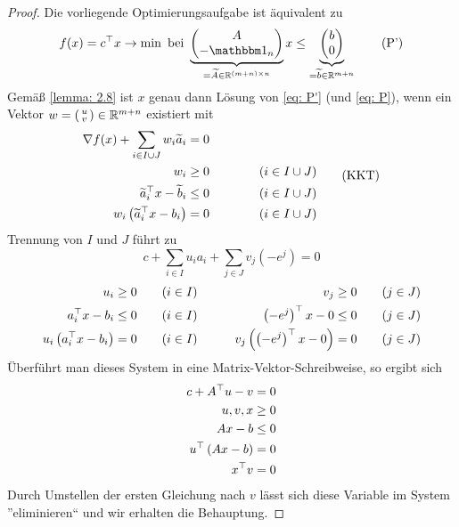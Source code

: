 \begin{proof}
	Die vorliegende Optimierungsaufgabe ist äquivalent zu
	\begin{equation*}
		f(x) = \trans{c} x \to \min \bei \underbrace{\begin{pmatrix} A \\ - \one_n \end{pmatrix}}_{= \schlange{A} \in \R^{(m + n) \times n}} x \le \underbrace{\begin{pmatrix} b \\ 0 \end{pmatrix}}_{= \schlange{b} \in \R^{m+n}}
		\tag{P'}
		\label{eq: P'}
	\end{equation*}
	Gemäß \cref{lemma: 2.8} ist $x$ genau dann Lösung von \eqref{eq: P'} (und \eqref{eq: P}), wenn ein Vektor $w = \left( \begin{smallmatrix} u \\ v \end{smallmatrix} \right) \in \mathbb{R}^{m + n}$ existiert mit 
	\begin{equation*}
		\begin{alignedat}{2}
			\nabla f(x) + \sum_{i \in I \cup J} w_i \widetilde{a}_i &= 0 \\
			w_i &\ge 0 \qquad \qquad &&(i \in I \cup J) \\
			\widetilde{a}_i^{\top} x - \widetilde{b}_i &\le 0 &&(i \in I \cup J) \\
			w_i \left( \widetilde{a}_i^{\top} x - b_i \right) &= 0 &&(i \in I \cup J)
		\end{alignedat}
		\tag{KKT}
	\end{equation*}
	Trennung von $I$ und $J$ führt zu
	\begin{equation*}
		c + \sum_{i \in I} u_i a_i + \sum_{j \in J} v_j (-e^j) = 0
		\tag{KKT}
	\end{equation*}
	\begin{equation*}
		\begin{alignedat}{4}
			u_i &\ge 0 \qquad &&(i \in I) 											& v_j &\ge 0 \qquad &&(j \in J) \\
			a_i^{\top} x - b_i &\le 0 &&(i \in I) 									& \left( -e^j \right)^{\top} x - 0 &\le 0 &&(j \in J) \\
			u_i \left( a_i^{\top} x - b_i \right) &= 0 &&(i \in I) \qquad\quad	& v_j \left( \left( -e^j \right)^{\top} x - 0 \right) &= 0 &&(j \in J)  \\
		\end{alignedat}
	\end{equation*}
	Überführt man dieses System in eine Matrix-Vektor-Schreibweise, so ergibt sich
	\begin{equation*}
		\begin{aligned}
			c + A^{\top} u - v &= 0 \\
			u,v,x &\ge 0 \\
			Ax - b &\le 0 \\
			u^{\top} \left( Ax - b \right) &= 0 \\
			x^{\top} v &= 0
		\end{aligned}
	\end{equation*}
	Durch Umstellen der ersten Gleichung nach $v$ lässt sich diese Variable im System ''eliminieren`` und wir erhalten die Behauptung.
\end{proof}

